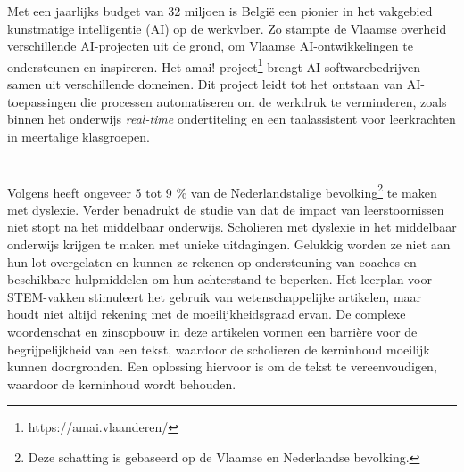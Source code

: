 \newline

Met een jaarlijks budget van 32 miljoen is België een pionier \autocite{Crevits2022} in het vakgebied kunstmatige intelligentie (AI) op de werkvloer.  Zo stampte de Vlaamse overheid verschillende AI-projecten uit de grond, om Vlaamse AI-ontwikkelingen te ondersteunen en inspireren. Het amai!-project\footnote{https://amai.vlaanderen/}  brengt AI-softwarebedrijven samen uit verschillende domeinen. Dit project leidt tot het ontstaan van AI-toepassingen die processen automatiseren om de werkdruk te verminderen, zoals binnen het onderwijs \textit{real-time} ondertiteling en een taalassistent voor leerkrachten in meertalige klasgroepen.

\section{}%
\label{sec:probleemstelling}



Volgens \textcite{Ghesquiere2018} heeft ongeveer 5 tot 9 \% van de Nederlandstalige bevolking\footnote{Deze schatting is gebaseerd op de Vlaamse en Nederlandse bevolking.} te maken met dyslexie. Verder benadrukt de studie van \textcite{Lissens2020} dat de impact van leerstoornissen niet stopt na het middelbaar onderwijs. Scholieren met dyslexie in het middelbaar onderwijs krijgen te maken met unieke uitdagingen. Gelukkig worden ze niet aan hun lot overgelaten en kunnen ze rekenen op ondersteuning van coaches en beschikbare hulpmiddelen om hun achterstand te beperken. Het leerplan voor STEM-vakken stimuleert het gebruik van wetenschappelijke artikelen, maar houdt niet altijd rekening met de moeilijkheidsgraad ervan. De complexe woordenschat en zinsopbouw in deze artikelen vormen een barrière voor de begrijpelijkheid van een tekst, waardoor de scholieren de kerninhoud moeilijk kunnen doorgronden. Een oplossing hiervoor is om de tekst te vereenvoudigen, waardoor de kerninhoud wordt behouden.

